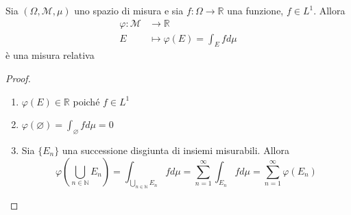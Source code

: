 \begin{proposition}\label{prop:gen_mis_rel}
    Sia \((\Omega, \mathcal{M}, \mu)\) uno spazio di misura e sia \(f : \Omega
    \to \mathbb{R}\) una funzione, \(f \in L^{1}\). Allora
    \begin{align*}
        \varphi : \mathcal{M} &\longrightarrow \mathbb{R} \\
        E &\longmapsto \varphi (E) = \int_E f d\mu
    \end{align*}
    è una misura relativa
\end{proposition}
\begin{proof} \(\) 
\begin{enumerate}[label = \arabic*.]
    \item \(\varphi(E) \in \mathbb{R}\) poiché \(f \in L^{1}\) 
    \item \(\varphi(\varnothing) = \int_\varnothing f d\mu = 0\)
    \item Sia \(\{E_{n}\} \) una successione disgiunta di insiemi misurabili.
        Allora
        \[
            \varphi\left( \bigcup_{n \in \mathbb{N}} E_{n} \right) =
            \int_{\bigcup_{n \in \mathbb{N}} E_{n} } f d\mu =
            \sum_{n=1}^{\infty} \int_{E_{n}} f d \mu =
            \sum_{n=1}^{\infty} \varphi(E_{n}) 
        \]
\end{enumerate}
\end{proof}

